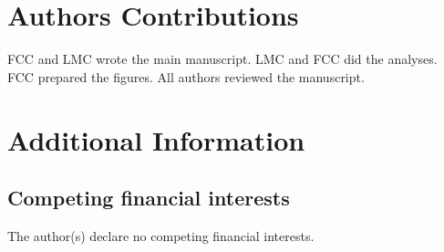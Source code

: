 \documentclass[10pt]{article}
\begin{document}
\section*{Authors Contributions}
FCC and LMC wrote the main manuscript. LMC and FCC did the analyses. FCC 
prepared the figures. All authors reviewed the manuscript.

\section*{Additional Information}
\subsection*{Competing financial interests}
The author(s) declare no competing financial interests.
\end{document}
